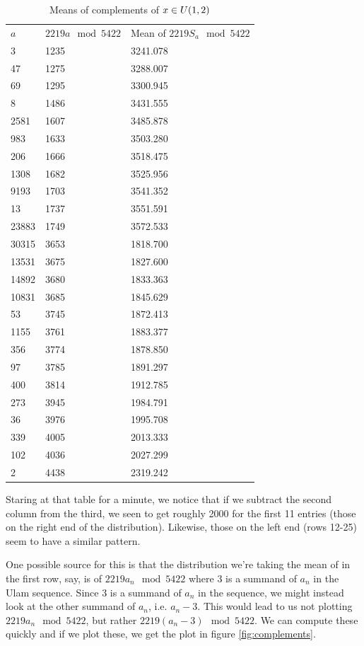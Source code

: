 \documentclass{report}
\theoremstyle{remark}
\numberwithin{equation}{section}
\begin{document}
\begin{table}
\caption{Means of complements of $x \in U(1,2)$}\label{tab:mean_comps}
\centering
\begin{tabular}{lll}
  $a$     &$2219 a \mod {5422}$ & Mean of $2219 S_a \mod{5422}$ \\
  3	&1235	&3241.078\\
  47	&1275	&3288.007\\
  69	&1295	&3300.945\\
  8	&1486	&3431.555\\
  2581	&1607	&3485.878\\
  983	&1633	&3503.280\\
  206	&1666	&3518.475\\
  1308	&1682	&3525.956\\
  9193	&1703	&3541.352\\
  13	&1737	&3551.591\\
  23883	&1749	&3572.533\\
  30315	&3653	&1818.700\\
  13531	&3675	&1827.600\\
  14892	&3680	&1833.363\\
  10831	&3685	&1845.629\\
  53	&3745	&1872.413\\
  1155	&3761	&1883.377\\
  356	&3774	&1878.850\\
  97	&3785	&1891.297\\
  400	&3814	&1912.785\\
  273	&3945	&1984.791\\
  36	&3976	&1995.708\\
  339	&4005	&2013.333\\
  102	&4036	&2027.299\\
  2	&4438	&2319.242
\end{tabular}
\end{table}

Staring at that table for a minute, we notice that if we subtract the
second column from the third, we seen to get roughly 2000 for the
first 11 entries (those on the right end of the distribution).
Likewise, those on the left end (rows 12-25) seem to have a similar
pattern.

One possible source for this is that the distribution we're taking the
mean of in the first row, say, is of $2219 a_n \mod{5422}$ where 3 is
a summand of $a_n$ in the Ulam sequence.  Since 3 is a summand of
$a_n$ in the sequence, we might instead look at the other summand of
$a_n$, i.e. $a_n - 3$.  This would lead to us not plotting
$2219a_n \mod {5422}$, but rather $2219(a_n-3) \mod{5422}$.  We can
compute these quickly and if we plot these, we get the plot in figure
\ref{fig:complements}.
\end{document}

